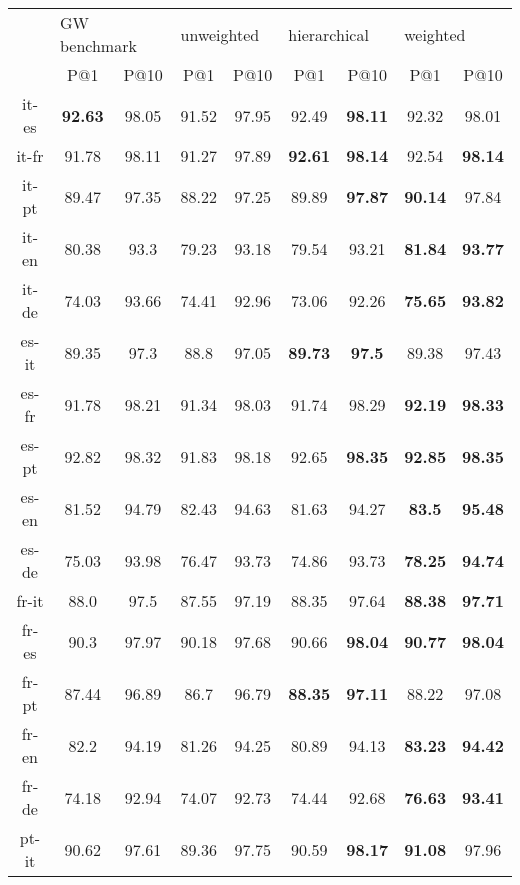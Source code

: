 \documentclass{article}
\begin{document}
\begin{table*}[t]
\centering
\begin{tabular}{c|cc|cc|cc|cc}
\hline
& \multicolumn{2}{l}{GW benchmark} & \multicolumn{2}{l}{unweighted} &
\multicolumn{2}{l}{hierarchical} &
\multicolumn{2}{l}{weighted}
\\
& P@1 & P@10 & P@1 & P@10 & P@1 & P@10 & P@1 & P@10 \\
\hline 
it-es  &  \bf 92.63  &  98.05  &  91.52  &  97.95  &  92.49  &  \bf 98.11  &  92.32  &  98.01 \\
it-fr  &  91.78  &  98.11  &  91.27  &  97.89  &  \bf 92.61  &  \bf 98.14  &  92.54  &  \bf 98.14 \\
it-pt  &  89.47  &  97.35  &  88.22  &  97.25  &  89.89  &  \bf 97.87  &  \bf 90.14  &  97.84 \\
it-en  &  80.38  &  93.3  &  79.23  &  93.18  &  79.54  &  93.21  &  \bf 81.84  &  \bf 93.77 \\
it-de  &  74.03  &  93.66  &  74.41  &  92.96  &  73.06  &  92.26  &  \bf 75.65  &  \bf 93.82 \\
es-it  &  89.35  &  97.3  &  88.8  &  97.05  &  \bf 89.73  &  \bf 97.5  &  89.38 &  97.43 \\
es-fr  &  91.78  &  98.21  &  91.34  &  98.03  &  91.74  &  98.29  &  \bf 92.19  &  \bf 98.33 \\
es-pt  &  92.82  &  98.32  &  91.83  &  98.18  &  92.65  &  \bf 98.35  &  \bf 92.85  &  \bf 98.35 \\
es-en  &  81.52  &  94.79  &  82.43  &  94.63  &  81.63  &  94.27  &  \bf 83.5  &  \bf 95.48 \\
es-de  &  75.03  &  93.98  &  76.47  &  93.73  &  74.86  &  93.73  &  \bf 78.25  &  \bf 94.74 \\
fr-it  &  88.0  &  97.5  &  87.55  &  97.19  &  88.35  &  97.64  &  \bf 88.38  &  \bf 97.71 \\
fr-es  &  90.3  &  97.97  &  90.18  &  97.68  &  90.66  &  \bf 98.04  &  \bf 90.77  &  \bf 98.04 \\
fr-pt  &  87.44  &  96.89  &  86.7  &  96.79  &  \bf 88.35  &  \bf 97.11  &   88.22  &  97.08 \\
fr-en  &  82.2  &  94.19  &  81.26  &  94.25  &  80.89  &  94.13  &  \bf 83.23  &  \bf 94.42 \\
fr-de  &  74.18  &  92.94  &  74.07  &  92.73  &  74.44  &  92.68  &  \bf 76.63  &  \bf 93.41 \\
pt-it  &  90.62  &  97.61  &  89.36  &  97.75  &  90.59  &  \bf 98.17  &  \bf 91.08  &  97.96 \\

\end{tabular}
\end{table*}
\end{document}
